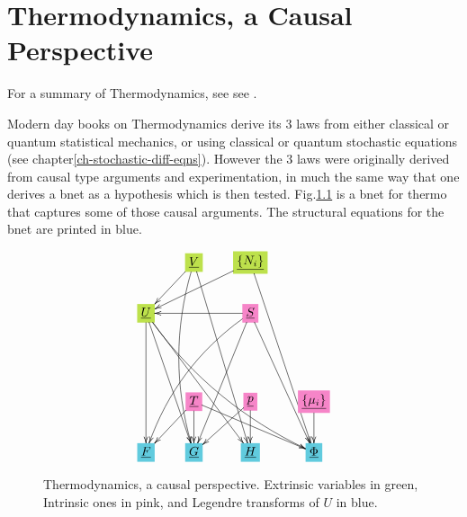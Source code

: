 \chapter{Thermodynamics, a Causal Perspective}
\label{ch-thermo}

For a summary of Thermodynamics, see
see \cite{wiki-thermo}.

Modern day books on Thermodynamics
derive its 3 laws from either classical
or quantum statistical mechanics, or using classical or quantum stochastic  equations
(see chapter\ref{ch-stochastic-diff-eqns}). However
the 3 laws 
were originally derived from causal type
	arguments and experimentation, in much
	the same way that one  derives a bnet
	as a hypothesis which is then tested.
Fig.\ref{fig-texnn-for-thermo} is a bnet for thermo that
captures some of those causal arguments.
The structural equations for the bnet are printed in blue.

	


\begin{figure}[h!]\centering
	$$\xymatrix{
		&*+[F*:SpringGreen]{\underline{V}}\ar@/_1pc/[dddd]\ar[ddddr]\ar[dl]&*+[F*:SpringGreen]{\underline{\{N_i\}}}\ar[ddddr]\ar[dll]&
		\\
		*+[F*:SpringGreen]{\underline{U}}\ar@/_1pc/[dddrrr]\ar[ddd]\ar[dddr]\ar[dddrr]&&*+[F*:Lavender]{\underline{S}}\ar[dddr]\ar@/_1pc/[dddll]\ar[dddl]\ar[ll]&
		\\
		&&&
		\\
		&*+[F*:Lavender]{\underline{T}}\ar[drr]\ar[dl]\ar[d]&*+[F*:Lavender]{\underline{p}}\ar[dl]\ar[d]&*+[F*:Lavender]{\underline{\{\mu_i\}}}\ar[d]
		\\
		*+[F*:SkyBlue]{\underline{F}}&*+[F*:SkyBlue]{\underline{G}}&*+[F*:SkyBlue]{\underline{H}}&*+[F*:SkyBlue]{\underline{\Phi}}
	}$$
	\caption{Thermodynamics, a causal perspective. Extrinsic variables in green, Intrinsic ones in pink, and Legendre  transforms of $U$ in blue.}
	\label{fig-texnn-for-thermo}
\end{figure}

